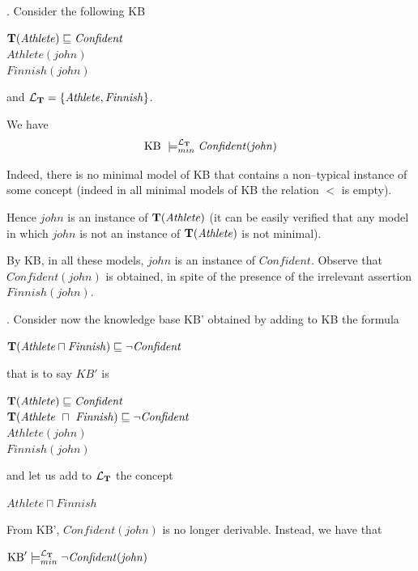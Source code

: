 \documentclass[a4paper, 11pt, oneside]{duthesis}
\newcommand{\tip}{{\bf T}}
\newcommand{\sqset}{\sqsubseteq}
\newcommand{\mint}{\sqcap}
\newcommand{\ellet} {\mathcal{L}_{\bf T}}
\begin{document}
\vspace{0.5cm}


.
Consider the following KB
\begin{center}
$\tip(\mathit{Athlete}) \sqset \mathit{Confident}$\\
$\mathit{Athlete}(\mathit{john})$\\
$\mathit{Finnish}(\mathit{john})$
\end{center}
and ${\ellet}=
\{\mathit{Athlete}, \mathit{Finnish}\}$.

We have $$\mbox{KB} \
\models_{min}^{\ellet} \mathit{Confident}(\mathit{john})$$

Indeed, there is no minimal model of KB that contains a non--typical instance of some concept (indeed in all minimal models of KB the relation $<$ is empty).

Hence $\mathit{john}$ is an instance of $\tip(\mathit{Athlete})$ (it can be easily verified that any model in which $\mathit{john}$ is not an instance of $\tip(\mathit{Athlete})$ is not minimal).

By KB, in all these models, $\mathit{john}$ is an instance of $\mathit{Confident}$.
Observe that $\mathit{Confident}(\mathit{john})$ is obtained, in spite of the presence of the irrelevant assertion $\mathit{Finnish}(\mathit{john})$.


\vspace{0.35cm}

. Consider now the knowledge base KB' obtained by adding to KB the formula

\begin{center}$\tip(\mathit{Athlete} \mint \mathit{Finnish}) \sqsubseteq \neg \mathit{Confident}$\end{center}

that is to say $KB'$ is 
\begin{center}
$\tip(\mathit{Athlete}) \sqset \mathit{Confident}$\\
$\tip(\mathit{Athlete} \ \mint \ \mathit{Finnish}) \sqsubseteq \neg \mathit{Confident}$\\
$\mathit{Athlete}(\mathit{john})$\\
$\mathit{Finnish}(\mathit{john})$
\end{center}
and let us add to ${\ellet}$ the concept

\begin{center}$\mathit{Athlete} \mint \mathit{Finnish}$\end{center}

From KB', $\mathit{Confident}(\mathit{john})$ is no longer derivable.
Instead, we have that
\begin{center}$\mbox{KB}' \models_{min}^{\ellet} \neg \mathit{Confident}(\mathit{john})$\end{center}
\end{document}
